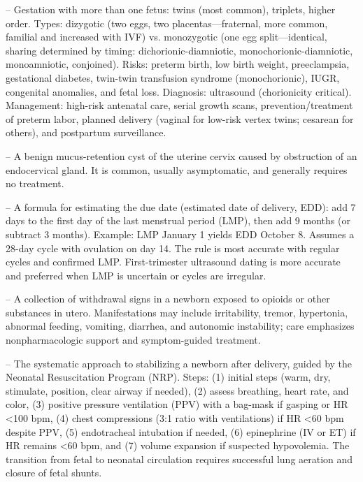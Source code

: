 -- Gestation with more than one fetus: twins (most common), triplets, higher order. Types: dizygotic (two eggs, two placentas—fraternal, more common, familial and increased with IVF) vs. monozygotic (one egg split—identical, sharing determined by timing: dichorionic-diamniotic, monochorionic-diamniotic, monoamniotic, conjoined). Risks: preterm birth, low birth weight, preeclampsia, gestational diabetes, twin-twin transfusion syndrome (monochorionic), IUGR, congenital anomalies, and fetal loss. Diagnosis: ultrasound (chorionicity critical). Management: high-risk antenatal care, serial growth scans, prevention/treatment of preterm labor, planned delivery (vaginal for low-risk vertex twins; cesarean for others), and postpartum surveillance.

-- A benign mucus-retention cyst of the uterine cervix caused by obstruction of an endocervical gland. It is common, usually asymptomatic, and generally requires no treatment.

-- A formula for estimating the due date (estimated date of delivery, EDD): add 7 days to the first day of the last menstrual period (LMP), then add 9 months (or subtract 3 months). Example: LMP January 1 yields EDD October 8. Assumes a 28-day cycle with ovulation on day 14. The rule is most accurate with regular cycles and confirmed LMP. First-trimester ultrasound dating is more accurate and preferred when LMP is uncertain or cycles are irregular.

-- A collection of withdrawal signs in a newborn exposed to opioids or other substances in utero. Manifestations may include irritability, tremor, hypertonia, abnormal feeding, vomiting, diarrhea, and autonomic instability; care emphasizes nonpharmacologic support and symptom-guided treatment.

-- The systematic approach to stabilizing a newborn after delivery, guided by the Neonatal Resuscitation Program (NRP). Steps: (1) initial steps (warm, dry, stimulate, position, clear airway if needed), (2) assess breathing, heart rate, and color, (3) positive pressure ventilation (PPV) with a bag-mask if gasping or HR <100 bpm, (4) chest compressions (3:1 ratio with ventilations) if HR <60 bpm despite PPV, (5) endotracheal intubation if needed, (6) epinephrine (IV or ET) if HR remains <60 bpm, and (7) volume expansion if suspected hypovolemia. The transition from fetal to neonatal circulation requires successful lung aeration and closure of fetal shunts.

